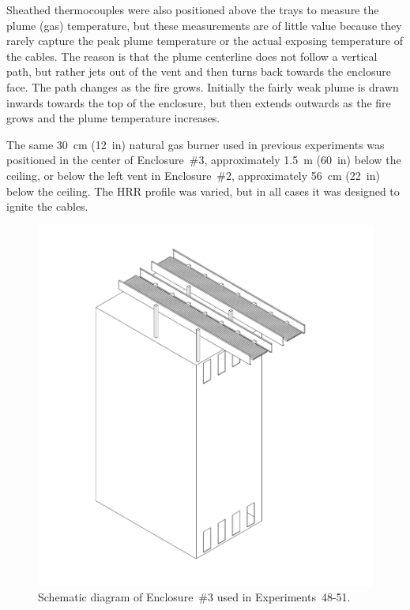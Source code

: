 Sheathed thermocouples were also positioned above the trays to measure the plume (gas) temperature, but these measurements are of little value because they rarely capture the peak plume temperature or the actual exposing temperature of the cables. The reason is that the plume centerline does not follow a vertical path, but rather jets out of the vent and then turns back towards the enclosure face. The path changes as the fire grows. Initially the fairly weak plume is drawn inwards towards the top of the enclosure, but then extends outwards as the fire grows and the plume temperature increases.

The same 30~cm (12~in) natural gas burner used in previous experiments was positioned in the center of Enclosure~\#3, approximately 1.5~m (60~in) below the ceiling, or below the left vent in Enclosure~\#2, approximately 56~cm (22~in) below the ceiling. The HRR profile was varied, but in all cases it was designed to ignite the cables.

\begin{figure}[!ht]
\includegraphics[width=6.5in]{../FIGURES/Cabinet_3_with_Tray}
\caption[Schematic diagram of Tests 48-51]{Schematic diagram of Enclosure~\#3 used in Experiments~48-51.}
\label{fig:Cabinet_3_3D}
\end{figure}

